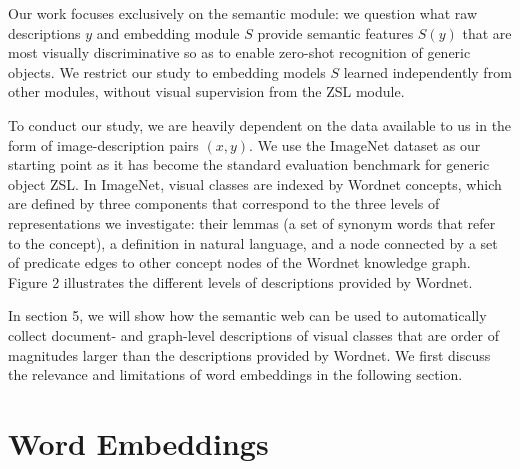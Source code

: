 Our work focuses exclusively on the semantic module: we question what raw descriptions $y$ and embedding module $S$ provide semantic features $S(y)$ that are most visually discriminative so as to enable zero-shot recognition of generic objects. We restrict our study to embedding models $S$ learned independently from other modules, without visual supervision from the ZSL module. 

To conduct our study, we are heavily dependent on the data available to us in the form of image-description pairs $(x,y)$. We use the ImageNet dataset as our starting point as it has become the standard evaluation benchmark for generic object ZSL. In ImageNet, visual classes are indexed by Wordnet concepts, which are defined by three components that correspond to the three levels of representations we investigate: their lemmas (a set of synonym words that refer to the concept), a definition in natural language, and a node connected by a set of predicate edges to other concept nodes of the Wordnet knowledge graph. Figure 2 illustrates the different levels of descriptions provided by Wordnet.

In section 5, we will show how the semantic web can be used to automatically collect document- and graph-level descriptions of visual classes that are order of magnitudes larger than the descriptions provided by Wordnet. We first discuss the relevance and limitations of word embeddings in the following section.

\section{Word Embeddings}
